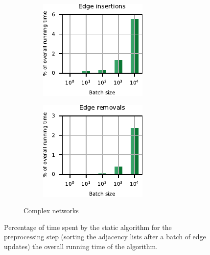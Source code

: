 \begin{figure}[H]
\begin{subfigure}[b]{.5\textwidth}
\begin{subfigure}[b]{.5\textwidth}
\centering
\includegraphics[width=.9\textwidth]{sources/plots/dyn-mwm/breakdown-cplx-insertion.pdf}
\end{subfigure}\hfill
\begin{subfigure}[b]{.5\textwidth}
\centering
\includegraphics[width=.9\textwidth]{sources/plots/dyn-mwm/breakdown-cplx-removal.pdf}
\end{subfigure}
\caption{Complex networks}
\end{subfigure}
\caption{Percentage of time spent by the static \suitor algorithm for
the preprocessing step (\ie sorting the adjacency lists after a batch
of edge updates) \wrt the overall running time of the algorithm.}
\label{fig:dyn-mwm:breakdown}
\end{figure}


